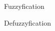         \begin{multicols}{2}
            \begin{figure}[H]
                \centering
                \caption{Fuzzyfication}
                \label{fig:fuzzy_input}
            \end{figure}

            \begin{figure}[H]
                \centering
                \caption{Defuzzyfication}
                \label{fig:fuzzy_output}
            \end{figure}
        \end{multicols}

